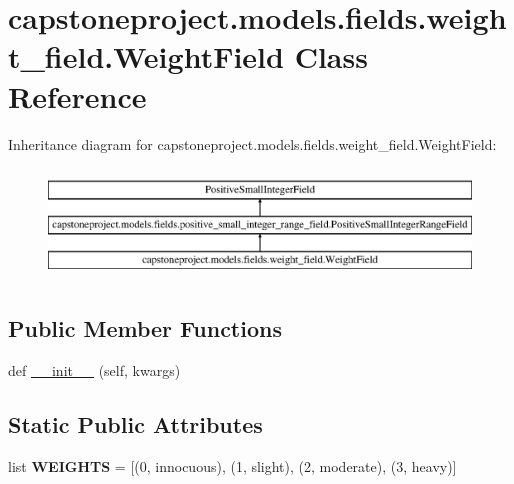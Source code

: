 \hypertarget{classcapstoneproject_1_1models_1_1fields_1_1weight__field_1_1_weight_field}{}\section{capstoneproject.\+models.\+fields.\+weight\+\_\+field.\+Weight\+Field Class Reference}
\label{classcapstoneproject_1_1models_1_1fields_1_1weight__field_1_1_weight_field}
Inheritance diagram for capstoneproject.\+models.\+fields.\+weight\+\_\+field.\+Weight\+Field\+:\begin{figure}[H]
\begin{center}
\leavevmode
\includegraphics[height=2.962963cm]{classcapstoneproject_1_1models_1_1fields_1_1weight__field_1_1_weight_field}
\end{center}
\end{figure}
\subsection*{Public Member Functions}
\begin{DoxyCompactItemize}
\item 
def \mbox{\hyperlink{classcapstoneproject_1_1models_1_1fields_1_1weight__field_1_1_weight_field_ae67fdb2fed60a7a285d081bcf9002475}{\+\_\+\+\_\+init\+\_\+\+\_\+}} (self, kwargs)
\end{DoxyCompactItemize}
\subsection*{Static Public Attributes}
\begin{DoxyCompactItemize}
\item 
\mbox{\label{classcapstoneproject_1_1models_1_1fields_1_1weight__field_1_1_weight_field_a15d2c02398d38bc59eaa5346436b7241}} 
list {\bfseries W\+E\+I\+G\+H\+TS} = \mbox{[}(0, \textquotesingle{}innocuous\textquotesingle{}), (1, \textquotesingle{}slight\textquotesingle{}), (2, \textquotesingle{}moderate\textquotesingle{}), (3, \textquotesingle{}heavy\textquotesingle{})\mbox{]}
\end{DoxyCompactItemize}
